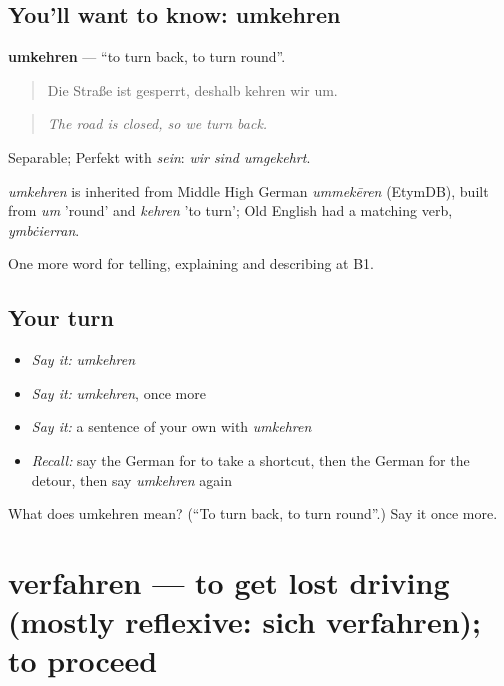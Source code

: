 \subsection*{You'll want to know: umkehren}
\textbf{umkehren} — \textquotedblleft{}to turn back, to turn round\textquotedblright{}.

\begin{quote}
Die Straße ist gesperrt, deshalb kehren wir um.
\end{quote}

\begin{quote}
\emph{The road is closed, so we turn back.}
\end{quote}

Separable; Perfekt with \emph{sein}: \emph{wir sind umgekehrt}.

\begin{cousinweb}
\emph{umkehren} is inherited from Middle High German \emph{ummekēren} (EtymDB), built from \emph{um} 'round' and \emph{kehren} 'to turn'; Old English had a matching verb, \emph{ymbċierran}.
\end{cousinweb}

\begin{grammarlens}[title={What you've built}]
One more word for telling, explaining and describing at B1.
\end{grammarlens}

\subsection*{Your turn}
\begin{itemize}
\raggedright
  \item \emph{Say it:} \emph{umkehren}
  \item \emph{Say it:} \emph{umkehren}, once more
  \item \emph{Say it:} a sentence of your own with \emph{umkehren}
  \item \emph{Recall:} say the German for to take a shortcut, then the German for the detour, then say \emph{umkehren} again
\end{itemize}

\begin{tcolorbox}[breakable,colback=teal!4,colframe=teal!35!black,title={Before you move on}]
What does umkehren mean? (\textquotedblleft{}To turn back, to turn round\textquotedblright{}.) Say it once more.
\end{tcolorbox}
\section[verfahren]{verfahren — to get lost driving (mostly reflexive: sich verfahren); to proceed}

